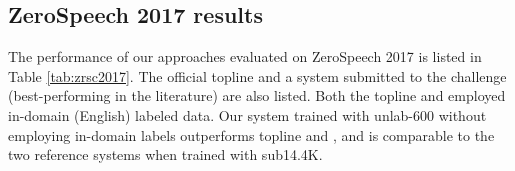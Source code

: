 \documentclass[a4paper]{article}
\begin{document}
\subsection{ZeroSpeech 2017 results}
\begin{table}[!t]
\renewcommand\arraystretch{0.80}
\centering
\caption{ABX error rate of  BNFs  on ZeroSpeech 2017 English sets. Models are trained with  Libri-light using Dutch labels.}
\label{tab:zrsc2017}
\end{table}
The performance of our approaches evaluated on ZeroSpeech 2017 is listed in Table \ref{tab:zrsc2017}. The official topline \cite{dunbar2017zero}  and a system submitted to the challenge (best-performing in the literature) \cite{shibata2017composite} are also listed. Both the topline and \cite{shibata2017composite}  employed in-domain (English) labeled data. Our system trained with unlab-600 without employing in-domain labels outperforms topline and \cite{shibata2017composite}, and is comparable to the two reference systems when trained with sub14.4K.
\end{document}

